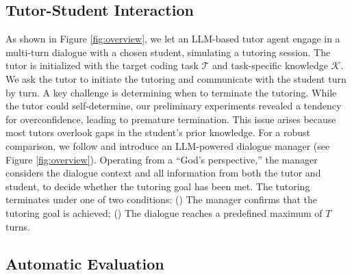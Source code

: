 \subsection{Tutor-Student Interaction}
\label{sec:tutor_student}
As shown in Figure \ref{fig:overview}, we let an LLM-based tutor agent engage in a multi-turn dialogue with a chosen student, simulating a tutoring session. The tutor is initialized with the target coding task $\mathcal{T}$ and task-specific knowledge $\mathcal{K}$. We ask the tutor to initiate the tutoring and communicate with the student turn by turn. A key challenge is determining when to terminate the tutoring. While the tutor could self-determine, our preliminary experiments revealed a tendency for overconfidence, leading to premature termination. This issue arises because most tutors overlook gaps in the student's prior knowledge. For a robust comparison, we follow \citet{wang-etal-2023-target} and introduce an LLM-powered dialogue manager (see Figure \ref{fig:overview}). Operating from a ``God's perspective,'' the manager considers the dialogue context and all information from both the tutor and student, to decide whether the tutoring goal has been met. The tutoring terminates under one of two conditions: () The manager confirms that the tutoring goal is achieved; () The dialogue reaches a predefined maximum of $T$ turns.



\subsection{Automatic Evaluation}

